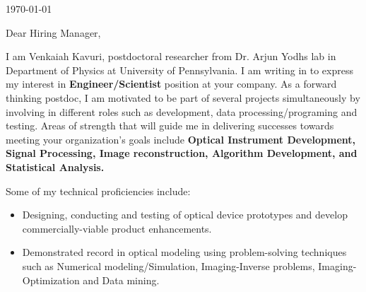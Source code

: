 \documentclass{my_cv}
\begin{document}
\vspace{-2mm}
\begin{center} 
\begin{footnotesize}
\end{footnotesize}

\href{https://www.linkedin.com/in/venkaiahchowdarykavuri}{\faLinkedinSquare} \href{https://github.com/Venki-Kavuri}{\faGithub} \href{https://scholar.google.com/citations?hl=en&user=r5E9ACIAAAAJ&view_op=list_works}{\aiGoogleScholar} \href{https://www.facebook.com/venki.kavuri}{\faFacebookOfficial}
\end{center} 
\vspace{5mm} 
\today\\
\vspace{5mm} 



Dear Hiring Manager,\\
\vspace{2mm}

I am Venkaiah Kavuri, postdoctoral researcher from Dr. Arjun Yodh\textquotesingle s lab in Department of Physics at University of Pennsylvania. I am writing in to express my interest in \textbf{Engineer/Scientist} position at your company. As a forward thinking postdoc, I am motivated to be part of several projects simultaneously by involving in different roles such as development, data processing/programing and testing. Areas of strength that will guide me in delivering successes towards meeting your organization's goals include  \textbf{Optical Instrument Development, Signal Processing, Image reconstruction, Algorithm Development, and Statistical Analysis.}\\
\vspace{2mm} 


Some of my technical proficiencies include:\\
\begin{itemize}\itemsep -2pt
\item Designing, conducting and testing of optical device prototypes and develop commercially-viable product enhancements.\\
\item Demonstrated record in optical modeling using problem-solving techniques such as Numerical modeling/Simulation, Imaging-Inverse problems, Imaging-Optimization and Data mining.\\

\end{itemize} 
\end{document}
